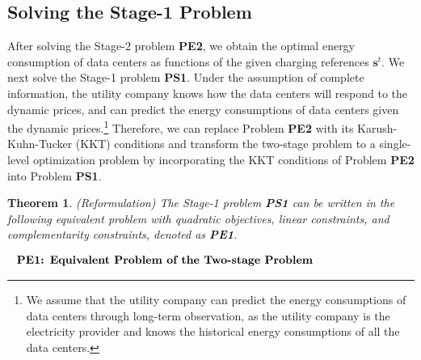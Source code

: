 \documentclass[journal]{IEEEtran}
\newtheorem{theorem}{Theorem}
\begin{document}
	\subsection{Solving the Stage-1 Problem}
	After solving the Stage-2 problem \textbf{PE2}, we obtain the optimal energy consumption of data centers as functions of the given charging references $\boldsymbol{s}^{t}$. We next solve the Stage-1 problem \textbf{PS1}. Under the assumption of complete information, the utility company knows how the data centers will respond to the dynamic prices, and can predict the energy consumptions of data centers given the dynamic prices.\footnote{We assume that the utility company can predict the energy consumptions of data centers through long-term observation, as the utility company is the electricity provider and knows the historical energy consumptions of all the data centers.} Therefore, we can replace Problem \textbf{PE2} with its Karush-Kuhn-Tucker (KKT) conditions and transform the two-stage problem to a single-level optimization problem \cite{kktmethod} by incorporating the KKT conditions of Problem \textbf{PE2} into Problem \textbf{PS1}.
	\begin{theorem}\label{reformulate_lp}
		(Reformulation) The Stage-1 problem \textbf{PS1} can be written in the following equivalent problem with quadratic objectives, linear constraints, and complementarity constraints, denoted as \textbf{PE1}.
	\end{theorem}
	\begin{align*}
		\leftline{\textbf{PE1: Equivalent Problem of the Two-stage Problem}}
	\end{align*}
\end{document}
